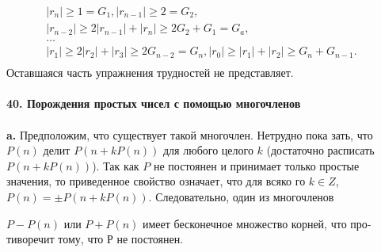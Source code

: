 \documentclass{mai_book}
\begin{document}
		$$\begin{array}{ccccc}
				|r_n| \geqslant 1 = G_1, |r_{n-1}| \geqslant 2 = G_2,\\
				|r_{n-2}| \geqslant 2|r_{n-1}| + |r_n| \geqslant 2G_2 + G_1 = G_a,\\
				\ldots                                                                                        & \\
				|r_1| \geqslant 2|r_2|+ |r_3| \geqslant 2G_{n-2} = G_n, |r_0| \geqslant |r_1| + |r_2| \geqslant G_n + G_{n-1}.\\
		\end{array}$$
Оставшаяся часть упражнения трудностей не представляет.\\
\\
\noindent\textbf{40. Порождения простых чисел с помощью многочленов}\\
\\
\hspace*{15pt}\textbf{a.} Предположим, что существует такой многочлен. Нетрудно пока­\linebreak
зать, что $P(n)$ делит $P(n + kP(n))$ для любого целого $k$ (достаточно\linebreak
расписать $P(n + kP(n))$). Так как $P$ не постоянен и принимает только\linebreak
простые значения, то приведенное свойство означает, что для всяко­\linebreak
го $k \in Z$, $P(n) = \pm P(n + kP(n)).$  Следовательно, один из многочленов\linebreak

\pagebreak
\noindent$P - P(n)$ или $P + P(n)$ имеет бесконечное множество корней, что про­\linebreak
тиворечит тому, что Р не постоянен.
\end{document}
